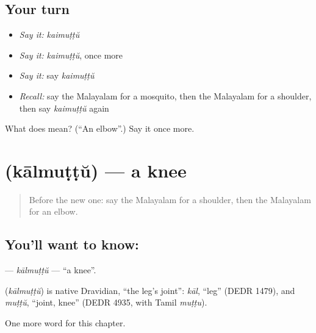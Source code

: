 \subsection*{Your turn}
\begin{itemize}
\raggedright
  \item \emph{Say it:} \emph{kaimuṭṭŭ}
  \item \emph{Say it:} \emph{kaimuṭṭŭ}, once more
  \item \emph{Say it:} say \emph{kaimuṭṭŭ}
  \item \emph{Recall:} say the Malayalam for a mosquito, then the Malayalam for a shoulder, then say \emph{kaimuṭṭŭ} again
\end{itemize}

\begin{tcolorbox}[breakable,colback=teal!4,colframe=teal!35!black,title={Before you move on}]
What does  mean? (\textquotedblleft{}An elbow\textquotedblright{}.) Say it once more.
\end{tcolorbox}
\section[\texorpdfstring{\ml{കാൽമുട്ട്} (kālmuṭṭŭ)}{കാൽമുട്ട് (kālmuṭṭŭ)}]{ (kālmuṭṭŭ) — a knee}

\label{lesson:ML-C154-kalmuttu}



\begin{quote}
Before the new one: say the Malayalam for a shoulder, then the Malayalam for an elbow.
\end{quote}

\subsection*{You'll want to know: }
\textbf{} — \emph{kālmuṭṭŭ} — \textquotedblleft{}a knee\textquotedblright{}.

\begin{cousinweb}
\textbf{} (\emph{kālmuṭṭŭ}) is native Dravidian, \textquotedblleft{}the leg's joint\textquotedblright{}: \emph{kāl}, \textquotedblleft{}leg\textquotedblright{} (DEDR 1479), and \emph{muṭṭŭ}, \textquotedblleft{}joint, knee\textquotedblright{} (DEDR 4935, with Tamil \emph{muṭṭu}).
\end{cousinweb}

\begin{grammarlens}[title={What you've built}]
One more word for this chapter.
\end{grammarlens}

